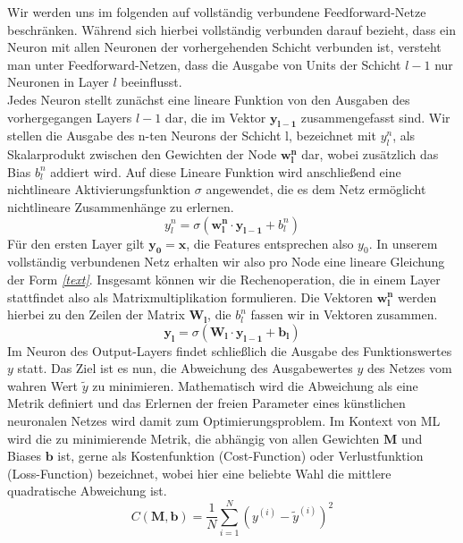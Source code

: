 Wir werden uns im folgenden auf vollständig verbundene Feedforward-Netze beschränken. Während sich hierbei vollständig verbunden darauf bezieht, dass ein Neuron mit allen Neuronen der vorhergehenden Schicht verbunden ist, versteht man unter Feedforward-Netzen, dass die Ausgabe von Units der Schicht $l-1$ nur Neuronen in Layer $l$ beeinflusst. \\
\newline
Jedes Neuron stellt zunächst eine lineare Funktion von den Ausgaben des vorhergegangen Layers $l-1$ dar, die im Vektor $\mathbf{y_{l-1}}$ zusammengefasst sind. Wir stellen die Ausgabe des n-ten Neurons der Schicht l, bezeichnet mit $y_l^n$, als Skalarprodukt zwischen den Gewichten der Node $\mathbf{w_{l}^n}$ dar, wobei zusätzlich das Bias $b_l^n$ addiert wird. Auf diese Lineare Funktion wird anschließend eine nichtlineare Aktivierungsfunktion $\sigma$ angewendet, die es dem Netz ermöglicht nichtlineare Zusammenhänge zu erlernen.
\begin{equation}
	y_l^n = \sigma\left(\mathbf{w_{l}^n} \cdot \mathbf{y_{l-1}} + b_{l}^n\right)
\end{equation}
Für den ersten Layer gilt  $\mathbf{y_0} = \mathbf{x}$, die Features entsprechen also $y_0$. In unserem vollständig verbundenen Netz erhalten wir also pro Node eine lineare Gleichung der Form \textit{\autoref{text}}. Insgesamt können wir die Rechenoperation, die in einem Layer stattfindet also als Matrixmultiplikation formulieren. Die Vektoren $\mathbf{w_{l}^n}$ werden hierbei zu den Zeilen der Matrix $\mathbf{W_l}$, die  $b_{l}^n$ fassen wir in Vektoren zusammen.
\begin{equation}
	\mathbf{y_l} = \sigma\left(\mathbf{W_l}\cdot \mathbf{y_{l-1}} + \mathbf{b_l}\right)
\end{equation}
Im Neuron des Output-Layers findet schließlich die Ausgabe des Funktionswertes $y$ statt. Das Ziel ist es nun, die Abweichung des Ausgabewertes $y$ des Netzes vom wahren Wert $\tilde{y}$ zu minimieren. Mathematisch wird die Abweichung als eine Metrik definiert und das Erlernen der freien Parameter eines künstlichen neuronalen Netzes wird damit zum Optimierungsproblem. Im Kontext von ML wird die zu minimierende Metrik, die abhängig von allen Gewichten $\mathbf{M}$ und Biases $\mathbf{b}$ ist, gerne als Kostenfunktion (Cost-Function) oder Verlustfunktion (Loss-Function) bezeichnet, wobei hier eine beliebte Wahl die mittlere quadratische Abweichung ist.
\begin{equation}
	C\left(\mathbf{M}, \mathbf{b}\right) = \frac{1}{N}\sum_{i=1}^{N}\left(y^{(i)} - \tilde{y}^{(i)}\right)^2
\end{equation}
